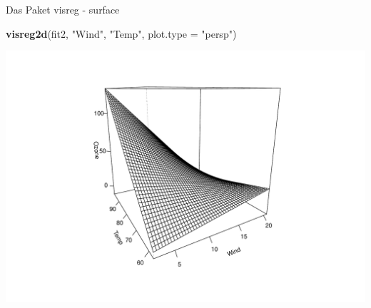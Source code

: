 \documentclass[ignorenonframetext,]{beamer}
\newenvironment{Shaded}{}{}
\newcommand{\KeywordTok}[1]{\textcolor[rgb]{0.00,0.44,0.13}{\textbf{{#1}}}}
\newcommand{\DataTypeTok}[1]{\textcolor[rgb]{0.56,0.13,0.00}{{#1}}}
\newcommand{\StringTok}[1]{\textcolor[rgb]{0.25,0.44,0.63}{{#1}}}
\newcommand{\NormalTok}[1]{{#1}}
\begin{document}
\begin{frame}[fragile]{Das Paket visreg - surface}

\begin{Shaded}
\begin{Highlighting}[]
\KeywordTok{visreg2d}\NormalTok{(fit2, }\StringTok{"Wind"}\NormalTok{, }\StringTok{"Temp"}\NormalTok{, }\DataTypeTok{plot.type =} \StringTok{"persp"}\NormalTok{)}
\end{Highlighting}
\end{Shaded}

\includegraphics{R_intern_files/figure-beamer/unnamed-chunk-319-1.pdf}

\end{frame}
\end{document}
